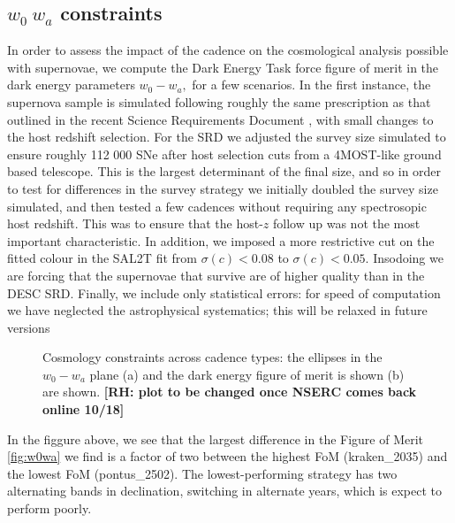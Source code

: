 \subsection{$w_0~w_a$ constraints}


In order to assess the impact of the cadence on the cosmological analysis possible with supernovae, we compute the Dark Energy Task force figure of merit in the dark energy parameters $w_0-w_a,$ for a few scenarios.
In the first instance, the supernova sample is simulated following roughly the same prescription as that outlined in the recent Science Requirements Document \cite{descsrd}, with small changes to the host redshift selection. For the SRD we adjusted the survey size simulated to ensure roughly 112 000 SNe after host selection cuts from a 4MOST-like ground based telescope. This is the largest determinant of the final size, and so in order to test for differences in the survey strategy we initially doubled the survey size simulated, and then tested a few cadences without requiring any spectrosopic host redshift. This was to ensure that the host-$z$ follow up was not the most important characteristic.
In addition, we imposed a more restrictive cut on the fitted colour in the SAL2T fit from $\sigma(c) < 0.08$ to $\sigma(c) < 0.05.$ Insodoing we are forcing that the supernovae that survive are of higher quality than in the DESC SRD.
Finally, we include only statistical errors: for speed of computation we have neglected the astrophysical systematics; this will be relaxed in future versions


\begin{figure}
  \begin{center}
    \caption{Cosmology constraints across cadence types: the ellipses in the $w_0-w_a$ plane (a) and the dark energy figure of merit is shown (b) are shown. \textbf{[RH: plot to be changed once NSERC comes back online 10/18]}}
    \end{center}
\end{figure}

In the figgure above, we see that the largest difference in the Figure of Merit \ref{fig:w0wa} we find is a factor of two between the highest FoM (kraken\_2035) and the lowest FoM (pontus\_2502). The lowest-performing strategy has two alternating bands in declination, switching in alternate years, which is expect to perform poorly. 


